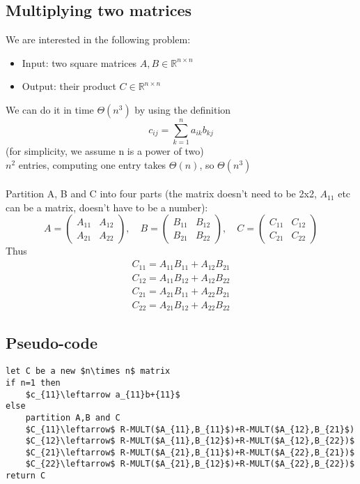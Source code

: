 \documentclass{article}[18pt]
\begin{document}
\subsection{Multiplying two matrices}
We are interested in the following problem:
\begin{itemize}
	\item Input: two square matrices $A,B \in \mathbb{R}^{n\times n}$
	\item Output: their product $C\in \mathbb{R}^{n\times n}$
\end{itemize}
We can do it in time $\Theta(n^3)$ by using the definition
\[
c_{i j}=\sum_{k=1}^{n} a_{i k} b_{k j}
\]
(for simplicity, we assume n is a power of two)\\
$n^2$ entries, computing one entry takes $\Theta(n)$, so $\Theta(n^3)$\\
\\
Partition A, B and C into four parts (the matrix doesn't need to be 2x2, $A_{11}$ etc can be a matrix, doesn't have to be a number):
\[
A=\left(\begin{array}{ll}{A_{11}} & {A_{12}} \\ {A_{21}} & {A_{22}}\end{array}\right), \quad B=\left(\begin{array}{ll}{B_{11}} & {B_{12}} \\ {B_{21}} & {B_{22}}\end{array}\right), \quad C=\left(\begin{array}{ll}{C_{11}} & {C_{12}} \\ {C_{21}} & {C_{22}}\end{array}\right)
\]
Thus
\[
\begin{array}{l}{C_{11}=A_{11} B_{11}+A_{12} B_{21}} \\ {C_{12}=A_{11} B_{12}+A_{12} B_{22}} \\ {C_{21}=A_{21} B_{11}+A_{22} B_{21}} \\ {C_{22}=A_{21} B_{12}+A_{22} B_{22}}\end{array}
\]
\newpage
\subsection{Pseudo-code}
\begin{lstlisting}[caption=R-MULT({A, B})]
let C be a new $n\times n$ matrix
if n=1 then
	$c_{11}\leftarrow a_{11}b+{11}$
else
	partition A,B and C
	$C_{11}\leftarrow$ R-MULT($A_{11},B_{11}$)+R-MULT($A_{12},B_{21}$)
	$C_{12}\leftarrow$ R-MULT($A_{11},B_{12}$)+R-MULT($A_{12},B_{22})$
	$C_{21}\leftarrow$ R-MULT($A_{21},B_{11}$)+R-MULT($A_{22},B_{21})$
	$C_{22}\leftarrow$ R-MULT($A_{21},B_{12}$)+R-MULT($A_{22},B_{22})$
return C
\end{lstlisting}
\end{document}
